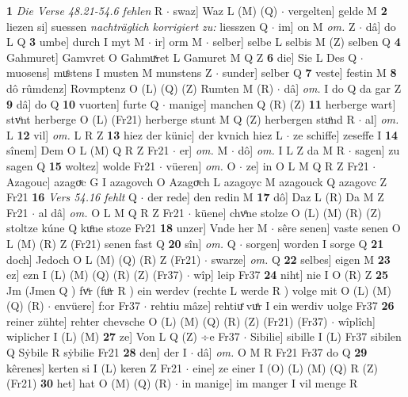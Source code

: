 \documentclass[8pt,a4paper,notitlepage]{article}
\begin{document}
\begin{table}[ht]
\begin{minipage}[t]{0.5\linewidth}
\textbf{1} \textit{Die Verse 48.21-54.6 fehlen} R   $\cdot$ swaz] Waz L (M) (Q)  $\cdot$ vergelten] gelde M \textbf{2} liezen si] suessen \textit{nachträglich korrigiert zu:} liesszen Q  $\cdot$ im] on M \textit{om.} Z  $\cdot$ dâ] do L Q \textbf{3} umbe] durch I myt M  $\cdot$ ir] orm M  $\cdot$ selber] selbe L selbis M (Z) selben Q \textbf{4} Gahmuret] Gamvret O Gahmuͯret L Gamuret M Q Z \textbf{6} die] Sie L Des Q  $\cdot$ muosens] muͤstens I musten M munstens Z  $\cdot$ sunder] selber Q \textbf{7} veste] festin M \textbf{8} dô rûmdenz] Rovmptenz O (L) (Q) (Z) Rumten M (R)  $\cdot$ dâ] \textit{om.} I do Q da gar Z \textbf{9} dâ] do Q \textbf{10} vuorten] furte Q  $\cdot$ manige] manchen Q (R) (Z) \textbf{11} herberge wart] stvͦnt herberge O (L) (Fr21) herberge stunt M Q (Z) herbergen stuͦnd R  $\cdot$ al] \textit{om.} L \textbf{12} vil] \textit{om.} L R Z \textbf{13} hiez der künic] der kvnich hiez L  $\cdot$ ze schiffe] zeseffe I \textbf{14} sînem] Dem O L (M) Q R Z Fr21  $\cdot$ er] \textit{om.} M  $\cdot$ dô] \textit{om.} I L Z da M R  $\cdot$ sagen] zu sagen Q \textbf{15} woltez] wolde Fr21  $\cdot$ vüeren] \textit{om.} O  $\cdot$ ze] in O L M Q R Z Fr21  $\cdot$ Azagouc] azagoͮc G I azagovch O Azagoͮch L azagoyc M azagouck Q azagovc Z Fr21 \textbf{16} \textit{Vers 54.16 fehlt} Q   $\cdot$ der rede] den redin M \textbf{17} dô] Daz L (R) Da M Z Fr21  $\cdot$ al dâ] \textit{om.} O L M Q R Z Fr21  $\cdot$ küene] chvͦne stolze O (L) (M) (R) (Z) stoltze kúne Q kuͦne stoze Fr21 \textbf{18} unzer] Vnde her M  $\cdot$ sêre senen] vaste senen O L (M) (R) Z (Fr21) senen fast Q \textbf{20} sîn] \textit{om.} Q  $\cdot$ sorgen] worden I sorge Q \textbf{21} doch] Jedoch O L (M) (Q) (R) Z (Fr21)  $\cdot$ swarze] \textit{om.} Q \textbf{22} selbes] eigen M \textbf{23} ez] ezn I (L) (M) (Q) (R) (Z) (Fr37)  $\cdot$ wîp] leip Fr37 \textbf{24} niht] nie I O (R) Z \textbf{25} Jm (Jmen Q ) fvͤr (fuͦr R ) ein werdev (rechte L werde R ) volge mit O (L) (M) (Q) (R)  $\cdot$ envüere] f:or Fr37  $\cdot$ rehtiu mâze] rehtiuͤ vuͤr I ein werdiv uolge Fr37 \textbf{26} reiner zühte] rehter chevsche O (L) (M) (Q) (R) (Z) (Fr21) (Fr37)  $\cdot$ wîplîch] wiplicher I (L) (M) \textbf{27} ze] Von L Q (Z) ÷e Fr37  $\cdot$ Sibilie] sibille I (L) Fr37 sibilen Q Sẏbile R sẏbilie Fr21 \textbf{28} den] der I  $\cdot$ dâ] \textit{om.} O M R Fr21 Fr37 do Q \textbf{29} kêrenes] kerten si I (L) keren Z Fr21  $\cdot$ eine] ze einer I (O) (L) (M) (Q) R (Z) (Fr21) \textbf{30} het] hat O (M) (Q) (R)  $\cdot$ in manige] im manger I vil menge R \newline
\end{minipage}

\end{table}
\end{document}
